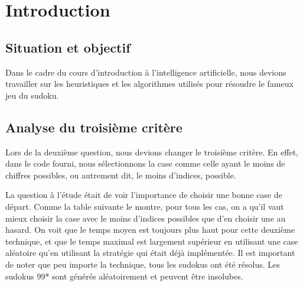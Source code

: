 \documentclass[8pt]{article}
\begin{document}



\onehalfspacing
\section{Introduction}
\subsection{Situation et objectif}
Dans le cadre du cours d'introduction à l'intelligence artificielle,
nous devions travailler sur les heuristiques et les algorithmes
utilisés pour résoudre le fameux jeu du sudoku.

\subsection{Analyse du troisième critère}
Lors de la deuxième question, nous devions changer le troisième
critère. En effet, dans le code fourni, nous sélectionnons la case
comme celle ayant le moins de chiffres possibles, ou autrement dit, le
moins d'indices, possible.

La question à l'étude était de voir l'importance de choisir une
bonne case de départ. Comme la table suivante le montre, pour tous
les cas, on a qu'il vaut mieux choisir la case avec le moins d'indices
possibles que d'en choisir une au hasard. On voit que le temps moyen
est toujours plus haut pour cette deuxième technique, et que le temps
maximal est largement supérieur en utilisant une case aléatoire qu'en utilisant
la stratégie qui était déjà implémentée. Il est important
de noter que peu importe la technique, tous les sudokus ont été résolus. Les
sudokus 99* sont générés aléatoirement et peuvent être insolubes.
\end{document}
